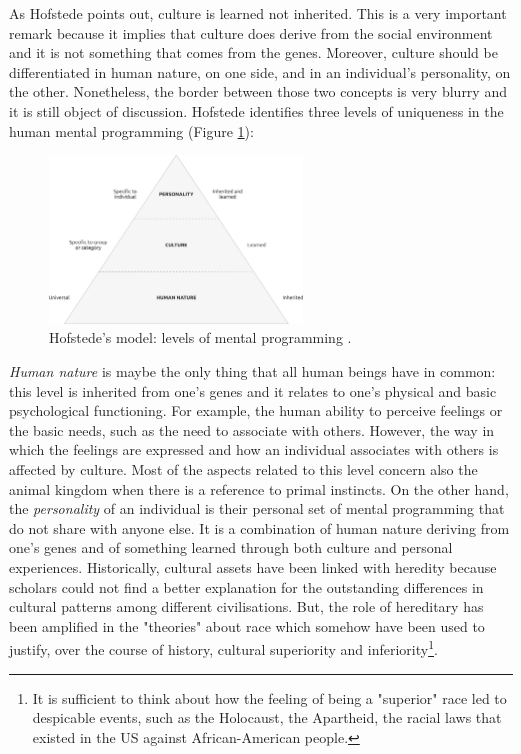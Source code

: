 \documentclass[../main.tex]{subfiles}
\begin{document}
As Hofstede points out, culture is learned not inherited. This is a very important remark because it implies that culture does derive from the social environment and it is not something that comes from the genes. Moreover, culture should be differentiated in human nature, on one side, and in an individual's personality, on the other. Nonetheless, the border between those two concepts is very blurry and it is still object of discussion. Hofstede identifies three levels of uniqueness in the human mental programming (Figure \ref{hofstede}):
\begin{figure}[h]
    \centering\includegraphics[width=0.6\textwidth]{images/levels-1}
    \caption{Hofstede's model: levels of mental programming \autocite[6]{hofstede}.}
    \label{hofstede}
\end{figure}

\textit{Human nature} is maybe the only thing that all human beings have in common: this level is inherited from one's genes and it relates to one's physical and basic psychological functioning. For example, the human ability to perceive feelings or the basic needs, such as the need to associate with others. However, the way in which the feelings are expressed and how an individual associates with others is affected by culture. Most of the aspects related to this level concern also the animal kingdom when there is a reference to primal instincts. On the other hand, the \textit{personality} of an individual is their personal set of mental programming that do not share with anyone else. It is a combination of human nature deriving from one's genes and of something learned through both culture and personal experiences. Historically, cultural assets have been linked with heredity because scholars could not find a better explanation for the outstanding differences in cultural patterns among different civilisations. But, the role of hereditary has been amplified in the "theories" about race which somehow have been used to justify, over the course of history, cultural superiority and inferiority\footnote{It is sufficient to think about how the feeling of being a "superior" race led to despicable events, such as the Holocaust, the Apartheid, the racial laws that existed in the US against African-American people.}.
\end{document}

